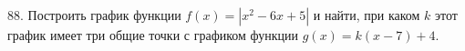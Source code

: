 88. Построить график функции $f(x)=|x^2-6x+5|$ и найти, при каком $k$ этот график имеет три общие точки с графиком функции $g(x)=k(x-7)+4.$\\
